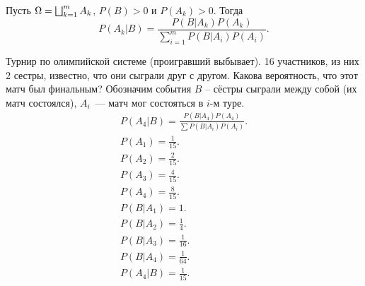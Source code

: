      \begin{theorem}[Байеса]
    Пусть $\Omega = \bigsqcup_{k=1}^m{A_k}$, $P(B) > 0$ и $P(A_k) > 0$. Тогда
         $$P(A_k|B) = \frac{P(B|A_k)P(A_k)}{\sum_{i=1}^m P(B|A_i)P(A_i)}.$$
     \end{theorem}
    
     \begin{example} Турнир по олимпийской системе (проигравший выбывает). 16 участников, из них 2 сестры, известно, что они сыграли друг с другом.
         Какова вероятность, что этот матч был финальным? Обозначим события $B$ -- сёстры сыграли между собой (их матч состоялся), $A_i$~--- матч мог состояться в $i$-м туре.
        \begin{gather*}
            P(A_4|B) = \frac{P(B|A_4)P(A_4)}{\sum P(B|A_i)P(A_i)}.\\
            P(A_1) = \frac{1}{15}.\\
            P(A_2) = \frac{2}{15}.\\
            P(A_3) = \frac{4}{15}.\\
            P(A_4) = \frac{8}{15}.\\
            P(B|A_1) = 1.\\
            P(B|A_2) = \frac{1}{4}.\\
            P(B|A_3) = \frac{1}{16}.\\
            P(B|A_4) = \frac{1}{64}.\\
            P(A_4|B)  = \frac{1}{15}.
        \end{gather*}
     \end{example}
    \newpage
